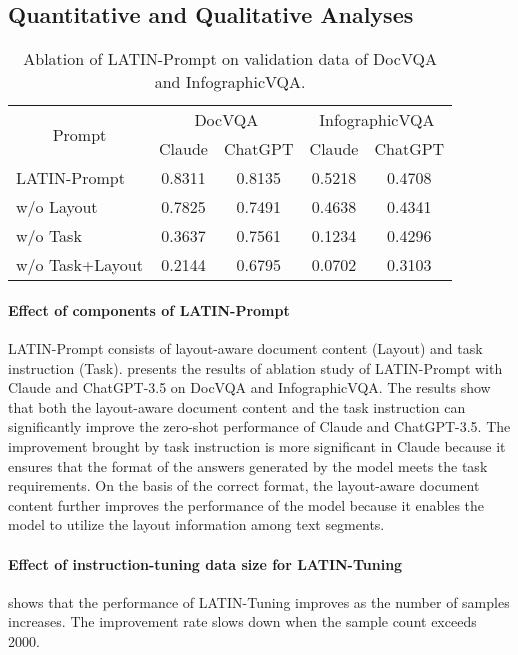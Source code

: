 \documentclass[letterpaper]{article} \usepackage{aaai24_preprint}  \usepackage{times}  \usepackage{helvet}  \usepackage{courier}  \usepackage[hyphens]{url}  \usepackage{graphicx} \urlstyle{rm} \def\UrlFont{\rm}  \usepackage{natbib}  \usepackage{caption} \frenchspacing  \setlength{\pdfpagewidth}{8.5in} \setlength{\pdfpageheight}{11in} \usepackage{algorithm}
\begin{document}
\subsection{Quantitative and Qualitative Analyses}
\begin{table}[t]
\small
\centering
\begin{tabular}{@{}lcccc@{}}
\toprule
\multicolumn{1}{c}{\multirow{2}{*}{Prompt}} & \multicolumn{2}{c}{DocVQA} & \multicolumn{2}{c}{InfographicVQA} \\
\multicolumn{1}{c}{}&Claude&ChatGPT&Claude&ChatGPT\\
\midrule
LATIN-Prompt&0.8311&0.8135&0.5218&0.4708\\
w/o Layout&0.7825&0.7491&0.4638&0.4341\\
w/o Task&0.3637&0.7561&0.1234&0.4296\\
w/o Task+Layout&0.2144&0.6795&0.0702&0.3103\\
\bottomrule
\end{tabular}
\caption{
Ablation of LATIN-Prompt on validation data of DocVQA and InfographicVQA.
}
\label{tab:ablation_study_claude}
\end{table}

\paragraph{Effect of components of LATIN-Prompt}
LATIN-Prompt consists of layout-aware document content (Layout) and task instruction (Task).
 presents the results of ablation study of LATIN-Prompt with Claude and ChatGPT-3.5 on DocVQA and InfographicVQA.
The results show that both the layout-aware document content and the task instruction can significantly improve the zero-shot performance of Claude and ChatGPT-3.5.
The improvement brought by task instruction is more significant in Claude because it ensures that the format of the answers generated by the model meets the task requirements.
On the basis of the correct format, the layout-aware document content further improves the performance of the model because it enables the model to utilize the layout information among text segments.

\paragraph{Effect of instruction-tuning data size for LATIN-Tuning}
 shows that the performance of LATIN-Tuning improves as the number of samples increases.
The improvement rate slows down when the sample count exceeds 2000.
\end{document}
